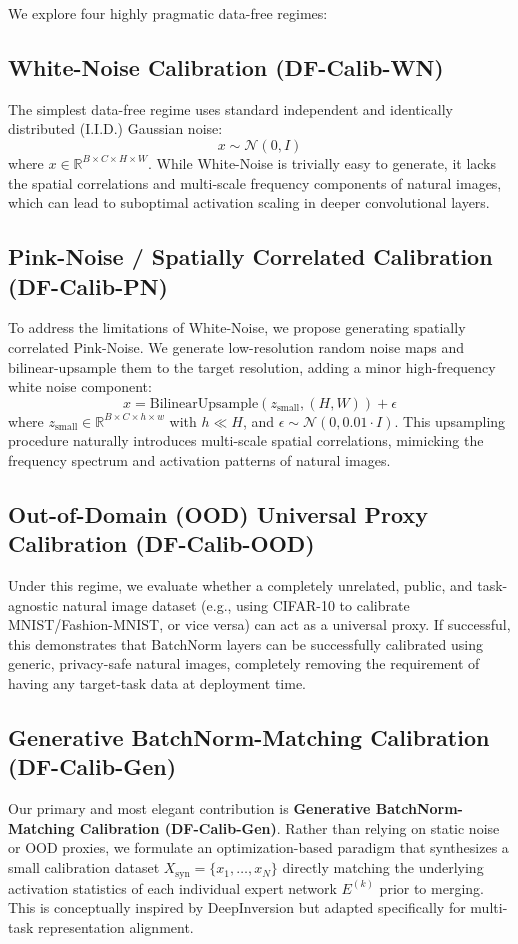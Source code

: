 \documentclass{article}
\theoremstyle{plain}
\theoremstyle{definition}
\theoremstyle{remark}
\begin{document}
We explore four highly pragmatic data-free regimes:

\subsection{White-Noise Calibration (DF-Calib-WN)}
The simplest data-free regime uses standard independent and identically distributed (I.I.D.) Gaussian noise:
\begin{equation}
  x \sim \mathcal{N}(0, I)
\end{equation}
where $x \in \mathbb{R}^{B \times C \times H \times W}$. While White-Noise is trivially easy to generate, it lacks the spatial correlations and multi-scale frequency components of natural images, which can lead to suboptimal activation scaling in deeper convolutional layers.

\subsection{Pink-Noise / Spatially Correlated Calibration (DF-Calib-PN)}
To address the limitations of White-Noise, we propose generating spatially correlated Pink-Noise. We generate low-resolution random noise maps and bilinear-upsample them to the target resolution, adding a minor high-frequency white noise component:
\begin{equation}
  x = \text{BilinearUpsample}(z_{\text{small}}, (H, W)) + \epsilon
\end{equation}
where $z_{\text{small}} \in \mathbb{R}^{B \times C \times h \times w}$ with $h \ll H$, and $\epsilon \sim \mathcal{N}(0, 0.01 \cdot I)$. This upsampling procedure naturally introduces multi-scale spatial correlations, mimicking the frequency spectrum and activation patterns of natural images.

\subsection{Out-of-Domain (OOD) Universal Proxy Calibration (DF-Calib-OOD)}
Under this regime, we evaluate whether a completely unrelated, public, and task-agnostic natural image dataset (e.g., using CIFAR-10 to calibrate MNIST/Fashion-MNIST, or vice versa) can act as a universal proxy. If successful, this demonstrates that BatchNorm layers can be successfully calibrated using generic, privacy-safe natural images, completely removing the requirement of having any target-task data at deployment time.

\subsection{Generative BatchNorm-Matching Calibration (DF-Calib-Gen)}
Our primary and most elegant contribution is \textbf{Generative BatchNorm-Matching Calibration (DF-Calib-Gen)}. Rather than relying on static noise or OOD proxies, we formulate an optimization-based paradigm that synthesizes a small calibration dataset $X_{\text{syn}} = \{x_1, \dots, x_N\}$ directly matching the underlying activation statistics of each individual expert network $E^{(k)}$ prior to merging. This is conceptually inspired by DeepInversion \cite{Yin2020} but adapted specifically for multi-task representation alignment.
\end{document}
